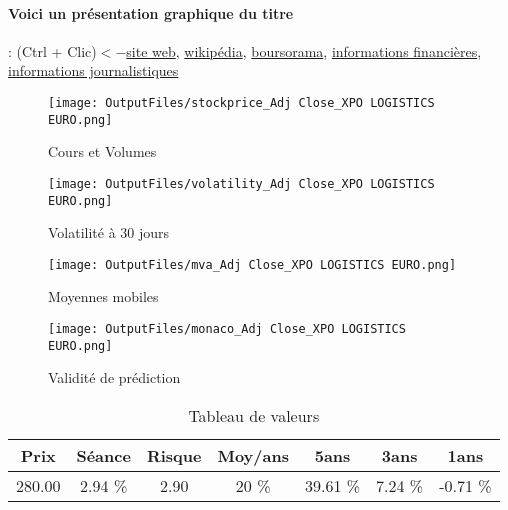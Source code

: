 \documentclass[11pt,a4paper]{report}%
\begin{document}
\paragraph{Voici un présentation graphique du titre} : (Ctrl + Clic)$<-$\href{https://europe.xpo.com/fr/investors/}{site web}, \href{https://fr.wikipedia.org/wiki/XPO_Logistics}{wikipédia}, \href{https://www.boursorama.com/cours/1rPXPO}{boursorama}, \href{https://www.qwant.com/?q=site:https:%2f%2fwww.easybourse.com%2faction-societe%2fXPO-LOGISTICS-EURO&t=web&client=ext-firefox-hp}{informations financières}, \href{https://bourse.lerevenu.com/cours-de-bourse/fiche-valeur-synthese/XPO-LOGISTICS-EURO/XPO-FR}{informations journalistiques}
\begin{figure}[!htb]
   \begin{minipage}{0.5\textwidth}
     \centering
     \texttt{[image: OutputFiles/stockprice\_Adj Close\_XPO LOGISTICS EURO.png]}
     \caption{Cours et Volumes}\label{Fig:price_XPO LOGISTICS EURO}
   \end{minipage}\hfill
   \begin{minipage}{0.5\textwidth}
     \centering
     \texttt{[image: OutputFiles/volatility\_Adj Close\_XPO LOGISTICS EURO.png]}
     \caption{Volatilité à 30 jours}\label{Fig:volat_XPO LOGISTICS EURO}
   \end{minipage}
\end{figure}
\begin{figure}[!htb]
   \begin{minipage}{0.5\textwidth}
     \centering
     \texttt{[image: OutputFiles/mva\_Adj Close\_XPO LOGISTICS EURO.png]}
     \caption{Moyennes mobiles}\label{Fig:mva_XPO LOGISTICS EURO}
   \end{minipage}\hfill
   \begin{minipage}{0.5\textwidth}
     \centering
     \texttt{[image: OutputFiles/monaco\_Adj Close\_XPO LOGISTICS EURO.png]}
     \caption{Validité de prédiction}\label{Fig:prediction_XPO LOGISTICS EURO}
   \end{minipage}
\end{figure}

\begin{table}[H]
  \centering
    \begin{tabular}{|c|c|c|c|c|c|c|}
    \hline
    Prix & Séance & Risque  & Moy/ans & 5ans & 3ans & 1ans \\
    \hline
    280.00 &    2.94 \%    & 2.90 & 20 \% & 39.61 \% & 7.24 \% & -0.71 \% \\
    \hline
    \end{tabular}%
        \label{tab:table_XPO 20ISTICS EURO}%
      \caption{Tableau de valeurs}
\end{table}%
\end{document}
